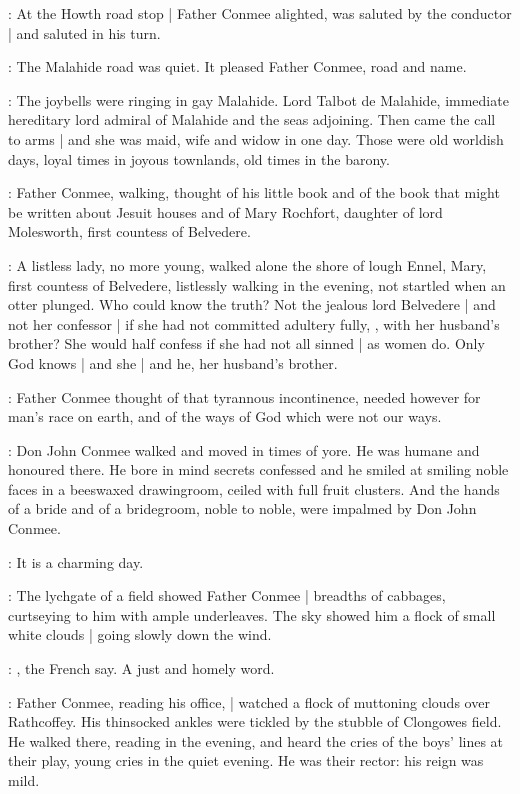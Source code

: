 :
At the Howth road stop |
Father Conmee alighted,
was saluted by the conductor |
and saluted in his turn.

:
The Malahide road was quiet.
It pleased Father Conmee, road and name.

\conmeeint:
The joybells were ringing in gay Malahide.
Lord Talbot de Malahide,
immediate hereditary lord admiral of Malahide and the seas adjoining.
Then came the call to arms |
and she was maid, wife and widow in one day.
Those were old worldish days,
loyal times in joyous townlands,
old times in the barony.%

:
Father Conmee, walking, thought of his little book
and of the book that might be written about Jesuit houses
and of Mary Rochfort,
daughter of lord Molesworth,
first countess of Belvedere.

\conmeeint:
A listless lady, no more young,
walked alone the shore of lough Ennel,
Mary, first countess of Belvedere,
listlessly walking in the evening,
not startled when an otter plunged.
Who could know the truth?
Not the jealous lord Belvedere |
and not her confessor |
if she had not committed adultery fully,
,
with her husband's brother?
She would half confess if she had not all sinned |
as women do.
Only God knows |
and she |
and he, her husband's brother.

:
Father Conmee thought of that tyrannous incontinence,
needed however for man's race on earth,
and of the ways of God which were not our ways.

:
Don John Conmee walked and moved in times of yore.
He was humane and honoured there.
He bore in mind secrets confessed
and he smiled at smiling noble faces in a beeswaxed drawingroom,
ceiled with full fruit clusters.
And the hands of a bride and of a bridegroom,
noble to noble,
were impalmed by Don John Conmee.

\conmeeint:
It is a charming day.

:
The lychgate of a field showed Father Conmee |
breadths of cabbages,
curtseying to him with ample underleaves.
The sky showed him a flock of small white clouds |
going slowly down the wind.

\conmeeint:
, the French say.
A just and homely word.

:
Father Conmee, reading his office, |
watched a flock of muttoning clouds over Rathcoffey.
His thinsocked ankles were tickled by the stubble of Clongowes field.
He walked there, reading in the evening,
and heard the cries of the boys' lines at their play,
young cries in the quiet evening.
He was their rector: his reign was mild.

